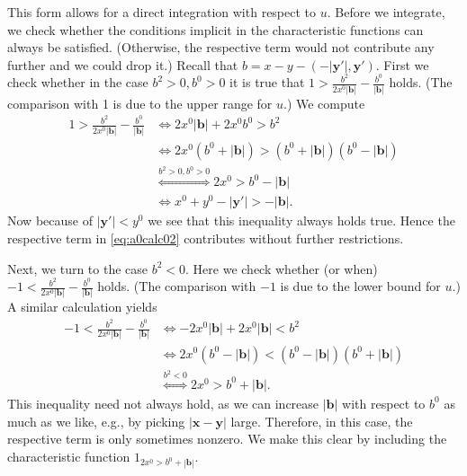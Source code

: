 \documentclass[b5paper,draft,openbib,12pt]{memoir}
\newcommand{\vx}{\mathbf{x}}
\newcommand{\vy}{\mathbf{y}}
\newcommand{\vb}{\mathbf{b}}
\begin{document}
This form allows for a direct integration with respect 
to $u$.
Before we integrate, we check whether the conditions 
implicit in the characteristic functions can always be 
satisfied. (Otherwise, the respective term would not 
contribute any further and we could drop it.) Recall 
that $	b = x-y-(-|\vy'|, \vy')$. First we check 
whether in the case \(b^2>0, b^0>0\) it is true that 
\( 1> \frac{b^2}{2x^0|\vb|} - \frac{b^0}{|\vb|}\) 
holds. (The comparison with 1 is due to the upper 
range for $u$.) We compute
\begin{align}
    1> \frac{b^2}{2x^0|\vb|} - \frac{b^0}{|\vb|} &\iff  2 x^0 |\vb|+2 x^0 b^0 > b^2 \nonumber\\
    &\iff 2 x^0(b^0 + |\vb|) > (b^0+|\vb|)(b^0-|\vb|)\nonumber\\
   &\!\!\!\! \overset{b^2>0,b^0>0}{\iff} 2x^0>b^0-|\vb| \nonumber \\
   &\iff  x^0+y^0\!\!- |\vy'| > -|\vb|.
\end{align}
Now because of \(|\vy'|<y^0\) we see that this 
inequality always holds true. Hence the respective 
term in \eqref{eq:a0calc02} contributes without 
further restrictions.

Next, we turn to the case \(b^2<0\). Here we check 
whether (or when) $-1<\frac{b^2}{2x^0|\vb|} - 
\frac{b^0}{|\vb|}$ holds. (The comparison with $-1$ 
is due to the lower bound for $u$.) A similar 
calculation yields 
\begin{align}
    -1<\frac{b^2}{2x^0|\vb|} - \frac{b^0}{|\vb|} &\iff -2x^0|\vb| + 2x^0 |\vb| < b^2\\
    &\iff 2x^0 (b^0-|\vb|) < (b^0-|\vb|)(b^0+|\vb|) \\
   & \overset{b^2<0}{\iff} 2x^0 > b^0 + |\vb|.
\end{align}
This inequality need not always hold, as we can 
increase \(|\vb|\) with respect to \(b^0\) as much as 
we like, e.g., by picking \(|\vx-\vy|\) large. 
Therefore, in this case, the respective term is only 
sometimes nonzero. We make this clear by including 
the characteristic function $1_{2x^0>b^0+|\vb|}$.
\end{document}
